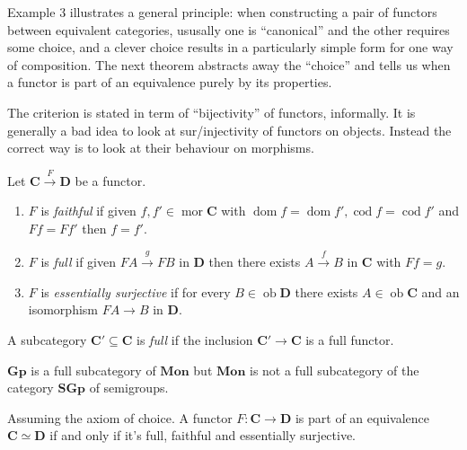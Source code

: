 \documentclass[a4paper]{article}
\renewcommand{\c}[1]{\mathbf{#1}}
\DeclareMathOperator{\ob}{ob}
\DeclareMathOperator{\mor}{mor}
\DeclareMathOperator{\dom}{dom}
\DeclareMathOperator{\cod}{cod}
\begin{document}
Example 3 illustrates a general principle: when constructing a pair of functors between equivalent categories, ususally one is ``canonical'' and the other requires some choice, and a clever choice results in a particularly simple form for one way of composition. The next theorem abstracts away the ``choice'' and tells us when a functor is part of an equivalence purely by its properties.

The criterion is stated in term of ``bijectivity'' of functors, informally. It is generally a bad idea to look at sur/injectivity of functors on objects. Instead the correct way is to look at their behaviour on morphisms.

\begin{definition}
  Let \(\c C \xrightarrow{F} \c D\) be a functor.
  \begin{enumerate}
  \item \(F\) is \emph{faithful} if given \(f, f' \in \mor \c C\) with \(\dom f = \dom f', \cod f = \cod f'\) and \(Ff = Ff'\) then \(f = f'\).
  \item \(F\) is \emph{full} if given \(FA \xrightarrow{g} FB\) in \(\c D\) then there exists \(A \xrightarrow{f} B\) in \(\c C\) with \(Ff = g\).
  \item \(F\) is \emph{essentially surjective} if for every \(B \in \ob \c D\) there exists \(A \in \ob \c C\) and an isomorphism \(FA \to B\) in \(\c D\).
  \end{enumerate}
\end{definition}

\begin{definition}
  A subcategory \(\c C' \subseteq \c C\) is \emph{full} if the inclusion \(\c C' \to \c C\) is a full functor.
\end{definition}

\begin{eg}
  \(\c{Gp}\) is a full subcategory of \(\c{Mon}\) but \(\c{Mon}\) is not a full subcategory of the category \(\c{SGp}\) of semigroups.
\end{eg}

\begin{lemma}
  Assuming the axiom of choice. A functor \(F: \c C \to \c D\) is part of an equivalence \(\c C \simeq \c D\) if and only if it's full, faithful and essentially surjective.
\end{lemma}
\end{document}
